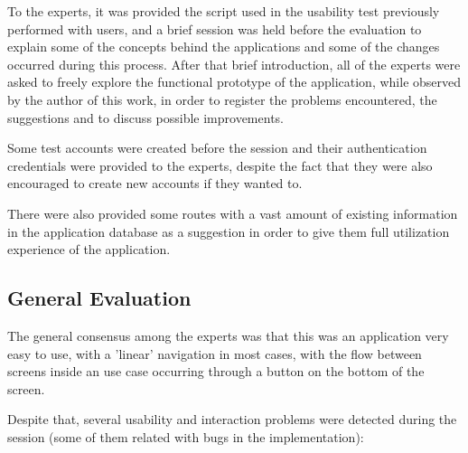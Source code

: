 To the experts, it was provided the script used in the usability test previously performed with users, and a brief session was held before the evaluation to explain some of the concepts behind the applications and some of the changes occurred during this process.
After that brief introduction, all of the experts were asked to freely explore the functional prototype of the application, while observed by the author of this work, in order to register the problems encountered, the suggestions and to discuss possible improvements.

Some test accounts were created before the session and their authentication credentials were provided to the experts, despite the fact that they were also encouraged to create new accounts if they wanted to.

There were also provided some routes with a vast amount of existing information in the application database as a suggestion in order to give them full utilization experience of the application.

\subsection{General Evaluation}

The general consensus among the experts was that this was an application very easy to use, with a 'linear' navigation in most cases, with the flow between screens inside an use case occurring through a button on the bottom of the screen.

Despite that, several usability and interaction problems were detected during the session (some of them related with bugs in the implementation):

